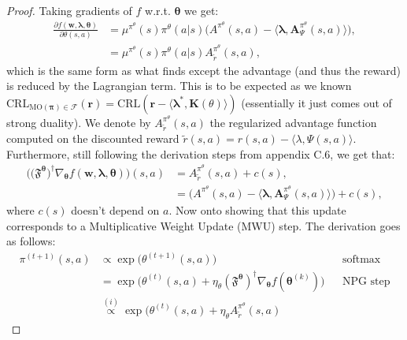 \begin{proof}
Taking gradients of $f$ w.r.t. $\bm{\theta}$ we get:
\begin{equation}
    \label{eq:NPG_Grad_step}
    \begin{aligned}
        \frac{\partial f(\bm{w},\bm{\lambda},\bm{\theta})}{\partial \theta(s,a)} &= \mu^{\pi^\theta}(s) \pi^\theta (a|s) \bigl( A^{\pi^\theta}(s,a) -\langle \bm{\lambda} , \bm{A}_\Psi^{\pi^\theta}(s,a) \rangle \bigr),\\
        &= \mu^{\pi^\theta}(s) \pi^\theta (a|s) A_{ \tilde{r}}^{\pi^\theta}(s,a),
    \end{aligned}
\end{equation}
which is the same form as what \cite{Cen2021} finds except the advantage (and thus the reward) is reduced by the Lagrangian term. This is to be expected as we known $\text{CRL}_{\text{MO}(\bm{\pi}) \in \mathcal{F}}(\bm{r}) = \text{CRL}(\bm{r} - \langle \bm{\lambda}^*, \bm{K}(\theta) \rangle)$ (essentially it just comes out of strong duality). We denote by $ A_{ \tilde{r}}^{\pi^\theta}(s,a)$ the regularized advantage function computed on the discounted reward $\tilde{r}(s,a) = r(s,a) - \langle \lambda, \Psi(s,a) \rangle$. Furthermore, still following the derivation steps from \cite{Cen2021} appendix C.6, we get that:
\begin{equation}
    \label{eq:NPG_Fisher_step}
    \begin{aligned}
        \Big(\bigl(\mathfrak{F}^{\bm{\theta}}\bigr)^\dagger\nabla_{\bm{\theta}} f(\bm{w},\bm{\lambda},\bm{\theta})\Big)(s,a) &=  
        A_{ \tilde{r}}^{\pi^\theta}(s,a)
         + c(s),\\
        &=  \bigl( A^{\pi^\theta}(s,a) -\langle \bm{\lambda} , \bm{A}_\Psi^{\pi^\theta}(s,a) \rangle \bigr) + c(s), 
    \end{aligned}
\end{equation}
where $c(s)$ doesn't depend on $a$. Now onto showing that this update corresponds to a Multiplicative Weight Update (MWU) step. The derivation goes as follows:
\begin{align*}
    \pi^{(t+1)}(s,a) &\propto \exp\big(
         \theta^{(t+1)}(s,a) 
         \big) && \text{softmax} \\
    &= \exp\big(
        \theta^{(t)}(s,a) 
        + \eta_\theta 
        (\mathfrak{F}^{\bm{\theta}})^\dagger
        \nabla_{\bm{\theta}} 
        f(\bm{\theta}^{(k)})
    \big) && \text{NPG step} \\
    &\stackrel{(i)}{\propto} \exp\big(
        \theta^{(t)}(s,a) 
        + \eta_\theta 
        A_{ \tilde{r}}^{\pi^\theta}(s,a)

\end{align*}
\end{proof}
